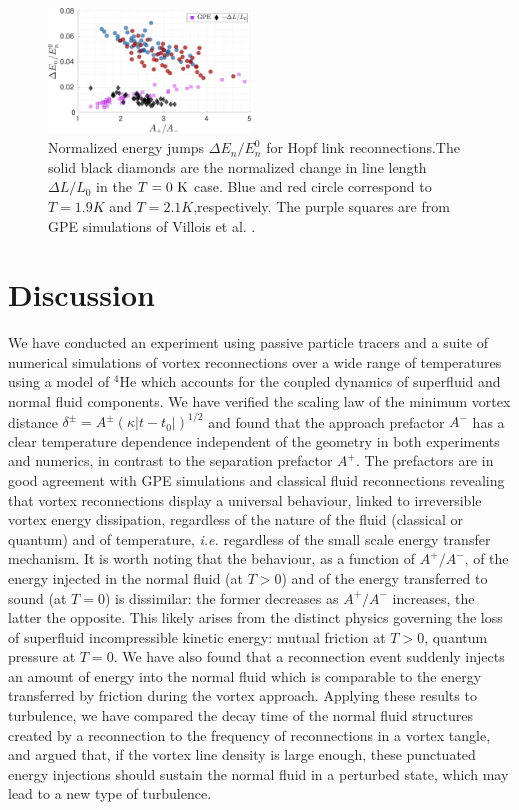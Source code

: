 \documentclass[9pt,twocolumn,twoside]{pnas-new}
\begin{document}
\begin{figure}
	\centering
	\includegraphics*[width=0.48\textwidth]{energy-jump.pdf}
	\caption{Normalized energy jumps $\Delta E_n/E_n^0$ for Hopf link 
reconnections.The solid black diamonds are the normalized change in line length $\Delta L/L_0$ in the
$T=0~\rm K$ case. Blue and red circle correspond to $T=1.9K$ and $T=2.1K$,respectively. The purple squares are from GPE simulations of
Villois et al. \cite{villoisIrreversibleDynamicsVortex2020}.}
	\label{fig:energy-jumps}
\end{figure}

\section*{Discussion}

We have conducted an experiment using passive particle tracers and a suite of numerical simulations of vortex reconnections over a wide range of temperatures using a model of $^4$He which accounts for the coupled dynamics of superfluid and normal fluid components.
We have verified the scaling law of the minimum vortex distance 
$\delta^{\pm}=A^{\pm} (\kappa |t-t_0|)^{1/2}$ and found that the approach prefactor $A^-$ has a clear temperature dependence independent of the geometry in both experiments and numerics, in contrast to the
separation prefactor $A^+$. The prefactors are in good agreement
with GPE simulations \cite{villoisIrreversibleDynamicsVortex2020,allen2014} 
and classical fluid reconnections \cite{yaoSeparationScalingViscous2020}
revealing that vortex reconnections display a universal behaviour, linked to irreversible vortex energy dissipation, regardless of the nature
of the fluid (classical or quantum) and of temperature, \textit{i.e.} regardless of the small scale energy transfer mechanism. 
It is worth noting that the behaviour, as a function of $A^+/A^-$, of 
the energy injected in the normal fluid (at $T>0$) and of the energy transferred to sound (at $T=0$)
\cite{villoisIrreversibleDynamicsVortex2020,leadbeaterSoundEmissionDue2001b} is dissimilar: the former decreases as $A^+/A^-$
increases, the latter the opposite. This likely arises from the distinct physics governing the loss of superfluid 
incompressible kinetic energy: mutual friction at $T>0$, quantum pressure at $T=0$.
We have also found that a reconnection event suddenly injects an amount of energy 
into the normal fluid which is comparable to the energy transferred by friction
during the vortex approach. Applying these results to turbulence, we have
compared the decay time of the normal fluid structures created by a
reconnection to the frequency of reconnections in a vortex tangle, and argued
that, if the vortex line density is large enough, these punctuated
energy injections should sustain the normal fluid in a perturbed state, which may lead to a new type of turbulence.
\end{document}

